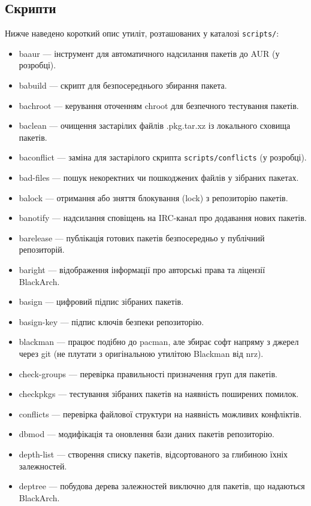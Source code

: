 \documentclass[a4paper, oneside, 11pt]{book}
\begin{document}
\subsection{Скрипти}
Нижче наведено короткий опис утиліт, розташованих у каталозі \verb|scripts/|:
\begin{itemize}
  \item baaur --- інструмент для автоматичного надсилання пакетів до AUR (у розробці).
  \item babuild --- скрипт для безпосереднього збирання пакета.
  \item bachroot --- керування оточенням chroot для безпечного тестування пакетів.
  \item baclean --- очищення застарілих файлів .pkg.tar.xz із локального сховища пакетів.
  \item baconflict --- заміна для застарілого скрипта \verb|scripts/conflicts| (у розробці).
  \item bad-files --- пошук некоректних чи пошкоджених файлів у зібраних пакетах.
  \item balock --- отримання або зняття блокування (lock) з репозиторію пакетів.
  \item banotify --- надсилання сповіщень на IRC-канал про додавання нових пакетів.
  \item barelease --- публікація готових пакетів безпосередньо у публічний репозиторій.
  \item baright --- відображення інформації про авторські права та ліцензії BlackArch.
  \item basign --- цифровий підпис зібраних пакетів.
  \item basign-key --- підпис ключів безпеки репозиторію.
  \item blackman --- працює подібно до pacman, але збирає софт напряму з джерел через git (не плутати з оригінальною утилітою Blackman від nrz).
  \item check-groups --- перевірка правильності призначення груп для пакетів.
  \item checkpkgs --- тестування зібраних пакетів на наявність поширених помилок.
  \item conflicts --- перевірка файлової структури на наявність можливих конфліктів.
  \item dbmod --- модифікація та оновлення бази даних пакетів репозиторію.
  \item depth-list --- створення списку пакетів, відсортованого за глибиною їхніх залежностей.
  \item deptree --- побудова дерева залежностей виключно для пакетів, що надаються BlackArch.

\end{itemize}
\end{document}
